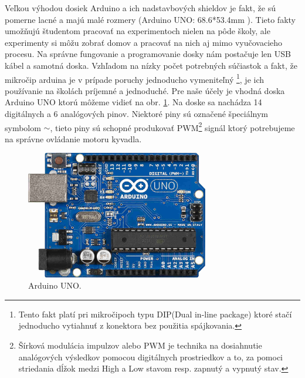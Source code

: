 Veľkou výhodou dosiek Arduino a ich nadstavbových shieldov je fakt, že sú pomerne lacné a majú malé rozmery (Arduino UNO: 68.6*53.4mm \cite{UNO} ). Tieto fakty umožňujú študentom pracovať na experimentoch nielen na pôde školy, ale experimenty si môžu zobrať domov a pracovať na nich aj mimo vyučovacieho procesu. Na správne fungovanie a programovanie dosky nám postačuje len USB kábel a samotná doska. Vzhľadom na nízky počet potrebných súčiastok a fakt, že mikročip arduina je v prípade poruchy jednoducho vymeniteľný \footnote[2]{Tento fakt platí pri mikročipoch typu DIP(Dual in-line package) ktoré stačí jednoducho vytiahnuť z konektora bez použitia spájkovania.}, je ich používanie na školách príjemné a jednoduché. Pre naše účely je vhodná doska Arduino UNO ktorú môžeme vidieť na obr. \ref{OBRAZOK 1.3}. Na doske sa nachádza 14 digitálnych a 6 analógových pinov. Niektoré piny sú označené špeciálnym symbolom $\sim$, tieto piny sú schopné produkovať PWM\footnote[3]{Šírková modulácia impulzov alebo PWM je technika na dosiahnutie analógových výsledkov pomocou digitálnych prostriedkov a to, za pomoci striedania dĺžok medzi High a Low stavom resp. zapnutý a vypnutý stav.} signál ktorý potrebujeme na správne ovládanie motoru kyvadla.

\begin{figure}[!tbh]
	\centering
	\includegraphics[width=80mm]{obr/arduino.jpg}
	\caption{{Arduino UNO.}}\label{OBRAZOK 1.3}
\end{figure}



